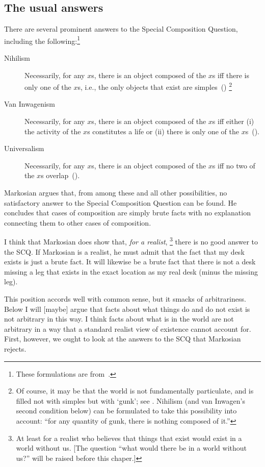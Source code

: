 \subsection{The usual answers}
There are several prominent answers to the Special Composition Question, including the following:\footnote{These formulations are from~\citet{markosian1998a}.}
\begin{description}
	\item[Nihilism] Necessarily, for any $x$s, there is an object composed of the $x$s iff there is only one of the $x$s, i.e., the only objects that exist are simples~(\citeyear[219]{markosian1998a})%
		\footnote{Of course, it may be that the world is not fundamentally particulate, and is filled not with simples but with `gunk'; see \citet{schaffer2003}. Nihilism (and van Inwagen's second condition below) can be formulated to take this possibility into account: ``for any quantity of gunk, there is nothing composed of it.''}%
	\item[Van Inwagenism] Necessarily, for any $x$s, there is an object composed of the $x$s iff either (i) the activity of the $x$s constitutes a life or (ii) there is only one of the $x$s~(\citeyear[221]{markosian1998a}).
	\item[Universalism] Necessarily, for any $x$s, there is an object composed of the $x$s iff no two of the $x$s overlap~(\citeyear[227]{markosian1998a}).
\end{description}

Markosian argues that, from among these and all other possibilities, no satisfactory answer to the Special Composition Question can be found. He concludes that cases of composition are simply brute facts with no explanation connecting them to other cases of composition.

I think that Markosian does show that, {\em for a realist},%
\footnote{At least for a realist who believes that things that exist would exist in a world without us. [The question ``what would there be in a world without us?'' will be raised before this chaper.]} %
%
there is no good answer to the SCQ. If Markosian is a realist, he must admit that the fact that my desk exists is just a brute fact. It will likewise be a brute fact that there is not a desk missing a leg that exists in the exact location as my real desk (minus the missing leg).

This position accords well with common sense, but it smacks of arbitrariness. Below I will [maybe] argue that facts about what things do and do not exist is not arbitrary in this way. I think facts about what is in the world are not arbitrary in a way that a standard realist view of existence cannot account for. First, however, we ought to look at the answers to the SCQ that Markosian rejects.

